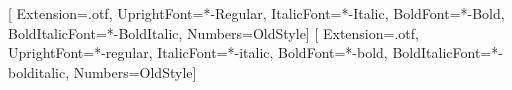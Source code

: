 
\usepackage[paperwidth=8.5in, paperheight=11in,
            top=0.7in, bottom=0.75in, inner=0.65in, outer=0.6in]{geometry}

\usepackage{fontspec}
  {\setmainfont{EBGaramond}[
     Extension=.otf, UprightFont=*-Regular, ItalicFont=*-Italic,
     BoldFont=*-Bold, BoldItalicFont=*-BoldItalic, Numbers=OldStyle]}
  {\setmainfont{texgyrepagella}[
     Extension=.otf, UprightFont=*-regular, ItalicFont=*-italic,
     BoldFont=*-bold, BoldItalicFont=*-bolditalic, Numbers=OldStyle]}

\usepackage{microtype}
\usepackage{xcolor}
\usepackage{fancyhdr}
\usepackage{needspace}


\setlength{\parindent}{0pt}
\setlength{\parskip}{0pt}
\linespread{1.08}
\raggedright

\pagestyle{fancy}
\fancyhf{}
\renewcommand{\headrulewidth}{0pt}
\fancyfoot[C]{\small\color{rubric}\thepage}


\newcommand{\OrderTitle}[1]{%
  \begin{center}
    {\LARGE\scshape\addfontfeatures{LetterSpace=6}#1\par}
    \vspace{4pt}
    {\color{rule}\rule{0.35\linewidth}{0.6pt}\par}
  \end{center}}
\newcommand{\OrderSubtitle}[1]{%
  \begin{center}\vspace{-6pt}{\itshape #1\par}\end{center}\vspace{6pt}}

